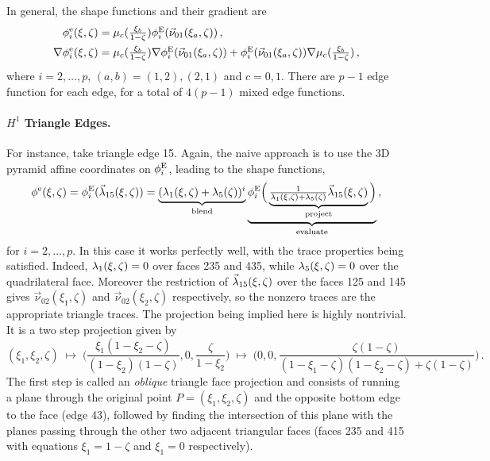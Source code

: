 In general, the shape functions and their gradient are
\begin{equation}
	\begin{aligned}
		\phi_i^\mathrm{e}(\xi,\zeta)&=\mu_c(\textstyle{\frac{\xi_b}{1-\zeta}})\phi_i^{\mathrm{E}}(\vec{\nu}_{01}(\xi_a,\zeta))\,,\\
    	\nabla\phi_i^\mathrm{e}(\xi,\zeta)&=\mu_c(\textstyle{\frac{\xi_b}{1-\zeta}})\nabla\phi_i^{\mathrm{E}}(\vec{\nu}_{01}(\xi_a,\zeta))
        +\phi_i^{\mathrm{E}}(\vec{\nu}_{01}(\xi_a,\zeta))\nabla\mu_c(\textstyle{\frac{\xi_b}{1-\zeta}})\,,	
	\end{aligned}
	\label{eq:PyrH1MixedEdge}
\end{equation}
where $i=2,\ldots,p$, $(a,b)=(1,2),(2,1)$ and $c=0,1$.
There are $p-1$ edge function for each edge, for a total of $4(p-1)$ mixed edge functions.

\paragraph{\texorpdfstring{$H^1$}{H1} Triangle Edges.}
For instance, take triangle edge 15.
Again, the naive approach is to use the 3D pyramid affine coordinates on $\phi_i^{\mathrm{E}}$, leading to the shape functions,
\begin{equation*}
	\phi^\mathrm{e}(\xi,\zeta)=\phi_i^{\mathrm{E}}(\vec{\lambda}_{15}(\xi,\zeta))=
		\underbrace{(\lambda_1(\xi,\zeta)+\lambda_5(\zeta))^i}_{\text{blend}}
    	\underbrace{\phi_i^{\mathrm{E}}\Big(\underbrace{\textstyle{\frac{1}{\lambda_1(\xi,\zeta)+\lambda_5(\zeta)}}
    		\vec{\lambda}_{15}(\xi,\zeta)}_{\text{project}}\Big)}_{\text{evaluate}}\,,
\end{equation*}
for $i=2,\ldots,p$.
In this case it works perfectly well, with the trace properties being satisfied.
Indeed, $\lambda_1(\xi,\zeta)=0$ over faces 235 and 435, while $\lambda_5(\xi,\zeta)=0$ over the quadrilateral face.
Moreover the restriction of $\vec{\lambda}_{15}(\xi,\zeta)$ over the faces 125 and 145 gives $\vec{\nu}_{02}(\xi_1,\zeta)$ and $\vec{\nu}_{02}(\xi_2,\zeta)$ respectively, so the nonzero traces are the appropriate triangle traces.
The projection being implied here is highly nontrivial. 
It is a two step projection given by
\begin{equation*}
	(\xi_1,\xi_2,\zeta)\;\longmapsto\;\Big(\textstyle{\frac{\xi_1(1-\xi_2-\zeta)}{(1-\xi_2)(1-\zeta)}},
		0,\textstyle{\frac{\zeta}{1-\xi_2}}\Big)\;\longmapsto\;
			\Big(0,0,\textstyle{\frac{\zeta(1-\zeta)}{(1-\xi_1-\zeta)(1-\xi_2-\zeta)+\zeta(1-\zeta)}}\Big)\,.
\end{equation*}
The first step is called an \textit{oblique} triangle face projection and consists of running a plane through the original point $P=(\xi_1,\xi_2,\zeta)$ and the opposite bottom edge to the face (edge 43), followed by finding the intersection of this plane with the planes passing through the other two adjacent triangular faces (faces 235 and 415 with equations $\xi_1=1-\zeta$ and $\xi_1=0$ respectively).
